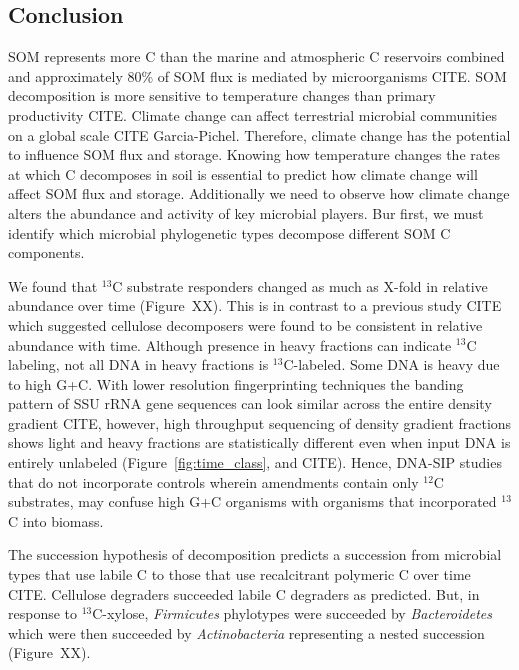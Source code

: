 \subsection{Conclusion}
SOM represents more C than the marine and atmospheric C reservoirs
combined and approximately 80\% of SOM flux is mediated by microorganisms
CITE. SOM decomposition is more sensitive to temperature changes than
primary productivity CITE. Climate change can affect terrestrial microbial
communities on a global scale CITE Garcia-Pichel. Therefore, climate
change has the potential to influence SOM flux and storage. Knowing how
temperature changes the rates at which C decomposes in soil is essential
to predict how climate change will affect SOM flux and storage.
Additionally we need to observe how climate change alters the abundance
and activity of key microbial players. Bur first, we must identify which
microbial phylogenetic types decompose different SOM C components.

We found that $^{13}$C substrate responders changed as much as X-fold in
relative abundance over time (Figure~XX). This is in contrast to
a previous study CITE which suggested cellulose decomposers were found to
be consistent in relative abundance with time. Although presence in heavy
fractions can indicate $^{13}$C labeling, not all DNA in heavy fractions
is $^{13}$C-labeled. Some DNA is heavy due to high G+C.
With lower resolution fingerprinting techniques the banding pattern of SSU
rRNA gene sequences can look similar across the entire density gradient
CITE, however, high throughput sequencing of density gradient fractions
shows light and heavy fractions are statistically different even when
input DNA is entirely unlabeled (Figure~\ref{fig:time_class}, and CITE).
Hence, DNA-SIP studies that do not incorporate controls wherein amendments
contain only $^{12}$C substrates, may confuse high G+C organisms with
organisms that incorporated $^{13}$C into biomass. 

The succession hypothesis of decomposition predicts a succession from
microbial types that use labile C to those that use recalcitrant polymeric
C over time CITE. Cellulose degraders succeeded labile C degraders as
predicted. But, in response to $^{13}$C-xylose,  \textit{Firmicutes}
phylotypes were succeeded by \textit{Bacteroidetes} which were then
succeeded by \textit{Actinobacteria} representing a nested succession
(Figure~XX). 

